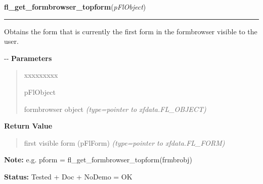 \hspace{.8\funcindent}\begin{boxedminipage}{\funcwidth}

    \raggedright \textbf{fl\_get\_formbrowser\_topform}(\textit{pFlObject})

    \vspace{-1.5ex}

    \rule{\textwidth}{0.5\fboxrule}
\setlength{\parskip}{2ex}

Obtains the form that is currently the first form in the formbrowser
visible to the user.

-{}-
\setlength{\parskip}{1ex}
      \textbf{Parameters}
      \vspace{-1ex}

      \begin{quote}
        \begin{Ventry}{xxxxxxxxx}

          \item[pFlObject]


formbrowser object
            {\it (type=pointer to xfdata.FL\_OBJECT)}

        \end{Ventry}

      \end{quote}

      \textbf{Return Value}
    \vspace{-1ex}

      \begin{quote}

first visible form (pFlForm)
      {\it (type=pointer to xfdata.FL\_FORM)}

      \end{quote}

\textbf{Note:} 
e.g. pform = fl\_get\_formbrowser\_topform(frmbrobj)


\textbf{Status:} 
Tested + Doc + NoDemo = OK


    \end{boxedminipage}

    \label{xformslib:flformbrowser:fl_set_formbrowser_topform}

    \vspace{0.5ex}

